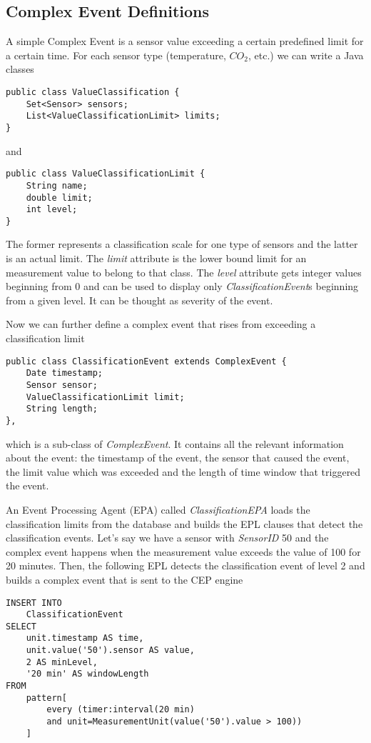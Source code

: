 \subsection{Complex Event Definitions}
A simple Complex Event is a sensor value exceeding a certain predefined limit for a certain time. For each sensor type (temperature, $CO_2$, etc.) we can write a Java classes
\begin{Verbatim}[xleftmargin=1.5em]
public class ValueClassification {
	Set<Sensor> sensors;
	List<ValueClassificationLimit> limits;
}
\end{Verbatim}
and
\begin{Verbatim}[xleftmargin=1.5em]
public class ValueClassificationLimit {
	String name;
	double limit;
	int level;
}
\end{Verbatim}

The former represents a classification scale for one type of sensors and the latter is an actual limit. The \emph{limit} attribute is the lower bound limit for an measurement value to belong to that class. The \emph{level} attribute gets integer values beginning from 0 and can be used to display only \emph{ClassificationEvent}s beginning from a given level. It can be thought as severity of the event.

Now we can further define a complex event that rises from exceeding a classification limit
\begin{Verbatim}[xleftmargin=1.5em]
public class ClassificationEvent extends ComplexEvent {
	Date timestamp;
	Sensor sensor;
	ValueClassificationLimit limit;
	String length;
},
\end{Verbatim}
which is a sub-class of \emph{ComplexEvent}. It contains all the relevant information about the event: the timestamp of the event, the sensor that caused the event, the limit value which was exceeded and the length of time window that triggered the event. 

An Event Processing Agent (EPA) called \emph{ClassificationEPA} loads the classification limits from the database and builds the EPL clauses that detect the classification events. Let's say we have a sensor with \emph{SensorID} 50 and the complex event happens when the measurement value exceeds the value of 100 for 20 minutes. Then, the following EPL detects the classification event of level 2 and builds a complex event that is sent to the CEP engine
\begin{Verbatim}[xleftmargin=1.5em]
INSERT INTO
	ClassificationEvent
SELECT 
	unit.timestamp AS time,
	unit.value('50').sensor AS value, 
	2 AS minLevel,
	'20 min' AS windowLength 
FROM
	pattern[
		every (timer:interval(20 min) 
		and unit=MeasurementUnit(value('50').value > 100))		
	]	
\end{Verbatim}

